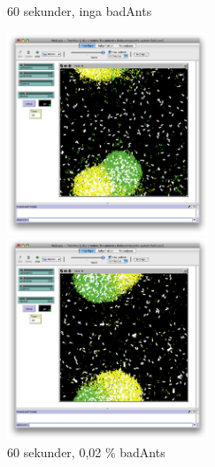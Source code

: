 \documentclass[titlepage, a4paper, 12pt]{article}
\begin{document}
\begin{figure}
  \begin{minipage}[b]{0.5\linewidth} %
    \centering
    \caption{60 sekunder, inga badAnts}
    \includegraphics[width=6cm]{images/no-bad-60.png}
  \end{minipage}
  \hspace{0.5cm} %
  \begin{minipage}[b]{0.5\linewidth}
    \centering
    \caption{60 sekunder, 0,02 \% badAnts}
    \includegraphics[width=6cm]{images/10-bad-60.png}
  \end{minipage}
  

\end{figure}
\end{document}

